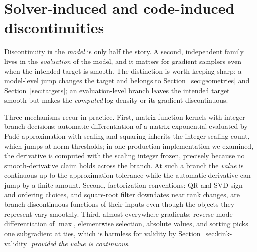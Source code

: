 \documentclass[11pt]{article}
\begin{document}
\section{Solver-induced and code-induced discontinuities}
\label{sec:solver}

Discontinuity in the \emph{model} is only half the story. A second,
independent family lives in the \emph{evaluation} of the model, and it matters
for gradient samplers even when the intended target is smooth. The distinction
is worth keeping sharp: a model-level jump changes the target and belongs to
Section~\ref{sec:geometries} and Section~\ref{sec:targets}; an evaluation-level branch leaves
the intended target smooth but makes the \emph{computed} log density or its
gradient discontinuous.

Three mechanisms recur in practice. First, matrix-function kernels with
integer branch decisions: automatic differentiation of a matrix exponential
evaluated by Pad\'e approximation with scaling-and-squaring inherits the
integer scaling count, which jumps at norm thresholds; in one production
implementation we examined, the derivative is computed with the scaling
integer frozen, precisely because no smooth-derivative claim holds across the
branch. At such a branch the \emph{value} is continuous up to the
approximation tolerance while the automatic derivative can jump by a finite
amount. Second, factorization conventions: QR and SVD sign and ordering
choices, and square-root filter downdates near rank changes, are
branch-discontinuous functions of their inputs even though the objects they
represent vary smoothly. Third, almost-everywhere gradients: reverse-mode
differentiation of $\max$, elementwise selection, absolute values, and sorting
picks one subgradient at ties, which is harmless for validity by
Section~\ref{sec:kink-validity} \emph{provided the value is continuous}.
\end{document}
